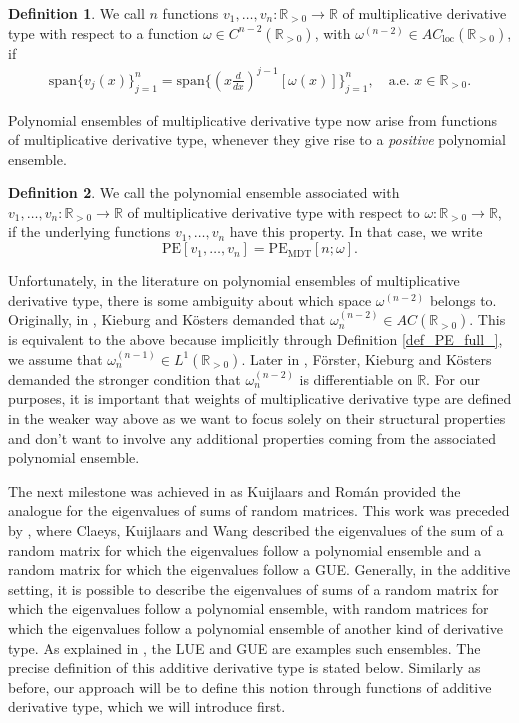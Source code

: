\documentclass[a4paper,12pt,oneside]{article}
\theoremstyle{definition}
\newtheorem{defi}{Definition}[section]
\newcommand{\R}{\mathbb{R}}
\newcommand{\om}{\omega}
\newcommand{\spn}[1]{\text{span}\{#1\}}
\begin{document}
\begin{defi} \label{MDT_def}
    We call $n$ functions $v_1,\dots,v_n:\R_{>0}\to\R$ of multiplicative derivative type with respect to a function $\om\in C^{n-2}(\R_{>0})$, with $\om^{(n-2)} \in AC_{\text{loc}}(\R_{>0})$, if
    \begin{align*}
        \spn{v_j(x)}_{j=1}^n = \spn{ (x \frac{d}{dx})^{j-1}[\om(x)]}_{j=1}^n,\quad \text{a.e. } x\in\R_{>0}.
    \end{align*}
\end{defi}

Polynomial ensembles of multiplicative derivative type now arise from functions of multiplicative derivative type, whenever they give rise to a \textit{positive} polynomial ensemble. 

\begin{defi} \label{PE_MDT_def}
     We call the polynomial ensemble associated with $v_1,\dots,v_n:\R_{>0}\to\R$ of multiplicative derivative type with respect to $\om:\R_{>0}\to\R$, if the underlying functions $v_1,\dots,v_n$ have this property. In that case, we write 
        $$\text{PE}[v_1,\dots,v_n] = \text{PE}_{\text{MDT}}[n;\om].$$
\end{defi}

Unfortunately, in the literature on polynomial ensembles of multiplicative derivative type, there is some ambiguity about which space $\om^{(n-2)}$ belongs to. Originally, in \cite{KK:SV_EV}, Kieburg and Kösters demanded that $\om_n^{(n-2)}\in AC(\R_{>0})$. This is equivalent to the above because implicitly through Definition \ref{def_PE_full_}, we assume that $\om_n^{(n-1)}\in L^{1}(\R_{>0})$. Later in \cite{FKK:PolyaE}, Förster, Kieburg and Kösters demanded the stronger condition that $\om_n^{(n-2)}$ is differentiable on $\R$. For our purposes, it is important that weights of multiplicative derivative type are defined in the weaker way above as we want to focus solely on their structural properties and don't want to involve any additional properties coming from the associated polynomial ensemble.
\medbreak

The next milestone was achieved in \cite{KR:add_DT} as Kuijlaars and Román provided the analogue for the eigenvalues of sums of random matrices. This work was preceded by \cite{CKW:sums_prod}, where Claeys, Kuijlaars and Wang described the eigenvalues of the sum of a random matrix for which the eigenvalues follow a polynomial ensemble and a random matrix for which the eigenvalues follow a GUE. Generally, in the additive setting, it is possible to describe the eigenvalues of sums of a random matrix for which the eigenvalues follow a polynomial ensemble, with random matrices for which the eigenvalues follow a polynomial ensemble of another kind of derivative type. As explained in \cite[Ex. 2.4 $c)$ \& $b)$]{FKK:PolyaE}, the LUE and GUE are examples such ensembles. The precise definition of this additive derivative type is stated below. Similarly as before, our approach will be to define this notion through functions of additive derivative type, which we will introduce first. 
\end{document}
